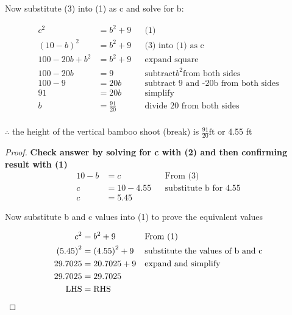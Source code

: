 \documentclass[12pt]{book}
\begin{document}
\begin{enumerate}
\newpage

\vspace{0.2cm}
\begin{center}
    Now substitute (3) into (1) as c and solve for b:
\end{center}

\vspace{-2em}
\begin{align*}
    c^2 & = b^2 + 9 && \text{(1)} \\
    (10 - b)^2 & = b^2 + 9 && \text{(3) into (1) as c} \\
    100 -20b + b^2 & = b^2 + 9 && \text{expand square} \\
    100 - 20b & = 9 && \text{subtract} b^2 \text{from both sides} \\
    100 - 9 & = 20b && \text{subtract 9 and -20b from both sides} \\
    91 & = 20b && \text{simplify} \\
    b & = \frac{91}{20} && \text{divide 20 from both sides} \\ 
\end{align*}

\vspace{-4em}
\begin{center}
    $\therefore$ the height of the vertical bamboo shoot (break) is $\boxed{\frac{91}{20} \text{ft}}$ or 4.55 ft
\end{center}

\vspace{1em}
\begin{proof}
    \textbf{Check answer by solving for c with (2) and then confirming result with (1)}
    \begin{align*}
        10 - b & = c && \text{From (3)} \\
        c & = 10 - 4.55 && \text{substitute b for 4.55} \\
        c & = 5.45
    \end{align*}

    \begin{center}
        Now substitute b and c values into (1) to prove the equivalent values
    \end{center}

    \vspace{-1em}
    \begin{align*}
        c^2 & = b^2 + 9 && \text{From (1)}\\
        {(5.45)}^2 & = {(4.55)}^2 + 9 && \text{substitute the values of b and c} \\
        29.7025 & = 20.7025 + 9 && \text{expand and simplify} \\
        29.7025 & = 29.7025 \\
        \text{LHS} & = \text{RHS} && \qedhere
    \end{align*}
        

\end{proof}
\end{enumerate}
\end{document}
